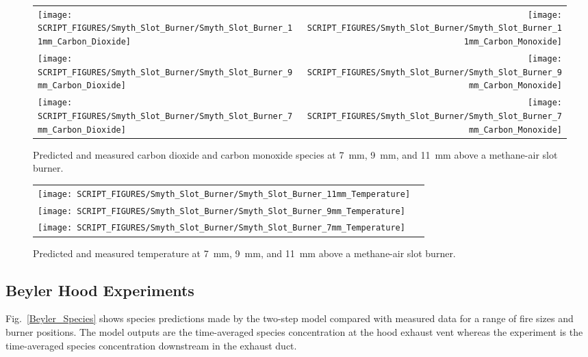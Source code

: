 \begin{figure}[p]
\begin{tabular*}{\textwidth}{l@{\extracolsep{\fill}}r}
\texttt{[image: SCRIPT\_FIGURES/Smyth\_Slot\_Burner/Smyth\_Slot\_Burner\_11mm\_Carbon\_Dioxide]} &
\texttt{[image: SCRIPT\_FIGURES/Smyth\_Slot\_Burner/Smyth\_Slot\_Burner\_11mm\_Carbon\_Monoxide]} \\
\texttt{[image: SCRIPT\_FIGURES/Smyth\_Slot\_Burner/Smyth\_Slot\_Burner\_9mm\_Carbon\_Dioxide]} &
\texttt{[image: SCRIPT\_FIGURES/Smyth\_Slot\_Burner/Smyth\_Slot\_Burner\_9mm\_Carbon\_Monoxide]} \\
\texttt{[image: SCRIPT\_FIGURES/Smyth\_Slot\_Burner/Smyth\_Slot\_Burner\_7mm\_Carbon\_Dioxide]} &
\texttt{[image: SCRIPT\_FIGURES/Smyth\_Slot\_Burner/Smyth\_Slot\_Burner\_7mm\_Carbon\_Monoxide]}
\end{tabular*}
\caption[Species predictions at 7~mm, 9~mm, and 11~mm above burner, Smyth experiment]
{Predicted and measured carbon dioxide and carbon monoxide species at 7~mm, 9~mm, and 11~mm above a methane-air slot burner.}
\label{Smyth_Slot_Burner_co_co2}
\end{figure}

\begin{figure}[p]
\begin{tabular*}{\textwidth}{l@{\extracolsep{\fill}}r}
\texttt{[image: SCRIPT\_FIGURES/Smyth\_Slot\_Burner/Smyth\_Slot\_Burner\_11mm\_Temperature]} \\
\texttt{[image: SCRIPT\_FIGURES/Smyth\_Slot\_Burner/Smyth\_Slot\_Burner\_9mm\_Temperature]} \\
\texttt{[image: SCRIPT\_FIGURES/Smyth\_Slot\_Burner/Smyth\_Slot\_Burner\_7mm\_Temperature]}
\end{tabular*}
\caption[Temperature predictions at 7~mm, 9~mm, and 11~mm above burner, Smyth experiment]
{Predicted and measured temperature at 7~mm, 9~mm, and 11~mm above a methane-air slot burner.}
\label{Smyth_Slot_Burner_temp}
\end{figure}

\clearpage

\subsection{Beyler Hood Experiments}

Fig.~\ref{Beyler_Species} shows species predictions made by the two-step model compared with measured data for a range of fire sizes and burner positions.  The model outputs are the time-averaged species concentration at the hood exhaust vent whereas the experiment is the time-averaged species concentration downstream in the exhaust duct.

